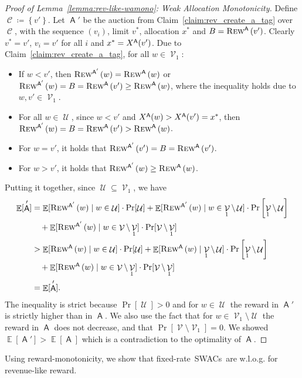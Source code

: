 \documentclass[11pt,letterpaper]{article}
\newcommand{\set}[1]{\left\{#1\right\}}
\newcommand{\sqbr}[1]{\left[ #1 \right]}
\newcommand{\brackets}[1]{\left( #1 \right)}
\newcommand{\fr}{fixed-rate\xspace}
\newcommand{\swacs}{SWACs\xspace}
\DeclareMathOperator*{\E}{\bb{E}}
\newcommand{\bb}[1]{\mathbb{#1}}
\DeclareMathOperator{\A}{\auc{A}}
\DeclareMathOperator{\C}{\mathcal{C}}
\DeclareMathOperator{\U}{\mathcal{U}}
\DeclareMathOperator{\V}{\mathcal{V}}
\newcommand{\vstar}{{v^*}}
\newcommand{\xstar}{{x^*}}
\theoremstyle{plain}
\newcommand{\auc}[1]{\mathsf{#1}}
\begin{document}
\begin{proof}[Proof of Lemma~\ref{lemma:rev-like-wamono}: Weak Allocation Monotonicity]
    Define $\C\coloneq \set{v'}$. Let $\A'$ be the auction from Claim~\ref{claim:rev_create_a_tag} over $\C$, with the sequence $\brackets{v_i}$, limit $\vstar$, allocation $\xstar$ and $B=\trew[\A]{v'}$. Clearly $\vstar=v'$, $v_i=v'$ for all $i$ and $\xstar=\x[\A]{v'}$. Due to Claim~\ref{claim:rev_create_a_tag}, for all $w\in\V_1$:
    \begin{itemize}
        \item If $w<v'$, then $\trew[\A']{w}=\trew[\A]{w}$ or $\trew[\A']{w}=B=\trew[\A]{v'}\geq \trew[\A]{w}$, where the inequality holds due to $w,v'\in\V_1$.
        \item For all $w\in\U$, since $w<v'$ and $\x[\A]{w}>\x[\A]{v'}=\xstar$, then $\trew[\A']{w}=B=\trew[\A]{v'}>\trew[\A]{w}$.
        \item For $w=v'$, it holds that $\trew[\A']{v'}=B=\trew[\A]{v'}$.
        \item For $w>v'$, it holds that $\trew[\A']{w}\geq \trew[\A]{w}$.
    \end{itemize}

    Putting it together, since $\U\subseteq\V_1$, we have
    \begin{align*}
         \E[\A']&=\E[\trew[\A']{w}\mid w\in\U]\cdot\Pr[\U]+\E[\trew[\A']{w}\mid w\in\V_1\setminus\U]\cdot\Pr\sqbr{\V_1\setminus\U}\\
         &\quad+\E[\trew[\A']{w}\mid w\in\V\setminus\V_1]\cdot\Pr[\V\setminus\V_1]\\
        &>\E[\trew[\A]{w}\mid w\in\U]\cdot\Pr[\U]+\E[\trew[\A]{w}\mid \V_1\setminus\U]\cdot\Pr\sqbr{\V_1\setminus\U}\\
         &\quad+\E[\trew[\A]{w}\mid w\in\V\setminus\V_1]\cdot\Pr[\V\setminus\V_1]\\
        &=\E[\A'].
    \end{align*}
    The inequality is strict because $\Pr[\U]>0$ and for $w\in\U$ the reward in $\A'$ is strictly higher than in $\A$. We also use the fact that for $w\in\V_1\setminus\U$ the reward in $\A$ does not decrease, and that $\Pr\sqbr{\V\setminus\V_1}=0$.
    We showed $\E[\A']>\E[\A]$ which is a contradiction to the optimality of $\A$.
\end{proof}

Using reward-monotonicity, we show that \fr\ \swacs\ are w.l.o.g. for revenue-like reward.
\end{document}
